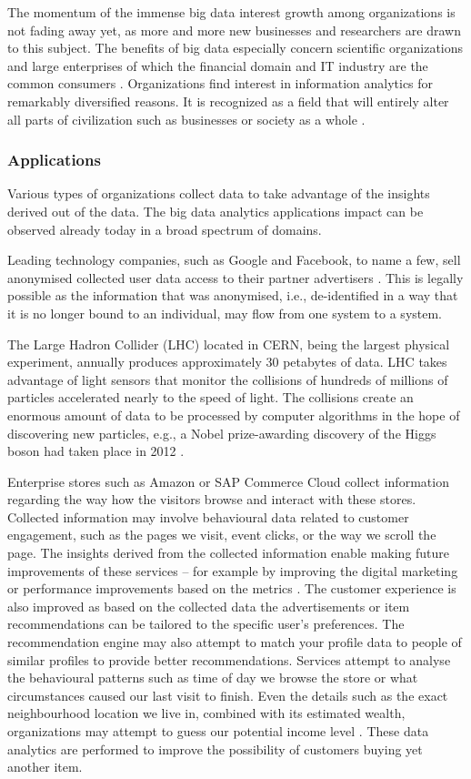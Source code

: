 \documentclass[a4paper,twoside,12pt]{book}
\begin{document}
The momentum of the immense big data interest growth among organizations is not fading away yet, as more and more new businesses and researchers are drawn to this subject. The benefits of big data especially concern scientific organizations and large enterprises of which the financial domain and IT industry are the common consumers \cite{bib:anonymization_chaos}. Organizations find interest in information analytics for remarkably diversified reasons. It is recognized as a field that will entirely alter all parts of civilization such as businesses or society as a whole \cite{bib:big_data_in_practice}.

\subsubsection{Applications}

Various types of organizations collect data to take advantage of the insights derived out of the data. The big data analytics applications impact can be observed already today in a broad spectrum of domains. 

Leading technology companies, such as Google and Facebook, to name a few, sell anonymised collected user data access to their partner advertisers \cite{bib:big_data_in_practice}. This is legally possible as the information that was anonymised, i.e., de-identified in a way that it is no longer bound to an individual, may flow from one system to a system.

The Large Hadron Collider (LHC) located in CERN, being the largest physical experiment, annually produces approximately 30 petabytes of data. LHC takes advantage of light sensors that monitor the collisions of hundreds of millions of particles accelerated nearly to the speed of light. The collisions create an enormous amount of data to be processed by computer algorithms in the hope of discovering new particles, e.g., a Nobel prize-awarding discovery of the Higgs boson had taken place in 2012 \cite{bib:cern}.

Enterprise stores such as Amazon or SAP Commerce Cloud collect information regarding the way how the visitors browse and interact with these stores. Collected information may involve behavioural data related to customer engagement, such as the pages we visit, event clicks, or the way we scroll the page. The insights derived from the collected information enable making future improvements of these services – for example by improving the digital marketing or performance improvements based on the metrics \cite{bib:sap}. The customer experience is also improved as based on the collected data the advertisements or item recommendations can be tailored to the specific user's preferences. The recommendation engine may also attempt to match your profile data to people of similar profiles to provide better recommendations. Services attempt to analyse the behavioural patterns such as time of day we browse the store or what circumstances caused our last visit to finish. Even the details such as the exact neighbourhood location we live in, combined with its estimated wealth, organizations may attempt to guess our potential income level \cite{bib:big_data_in_practice}. These data analytics are performed to improve the possibility of customers buying yet another item.
\end{document}
